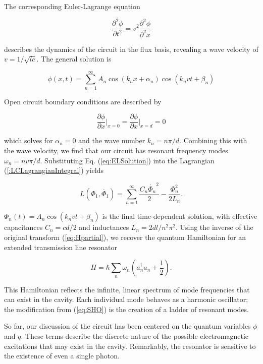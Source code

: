 \documentclass[11 pt, oneside]{book} %
\begin{document}
The corresponding Euler-Lagrange equation

\begin{equation}
\frac{\partial^2\phi}{\partial t^2}=v^2\frac{\partial^2\phi}{\partial^2 x}
\end{equation}

describes the dynamics of the circuit in the flux basis, revealing a wave velocity of $v=1/\sqrt{lc}$. The general solution is

\begin{equation}\label{eq:ELSolution}
\phi(x,t)=\sum_{n=1}^\infty A_n\cos(k_nx+\alpha_n)\cos(k_nvt+\beta_n)
\end{equation}

Open circuit boundary conditions are described by 

\begin{equation}
\frac{\partial\phi}{\partial x}\bigg|_{x=0}=\frac{\partial\phi}{\partial x}\bigg|_{x=d}=0
\end{equation}

which solves for $\alpha_n=0$ and the wave number $k_n=n\pi/d$. Combining this with the wave velocity, we find that our circuit has resonant frequency modes $\omega_n=nv\pi/d$. Substituting Eq. (\ref{eq:ELSolution}) into the Lagrangian (\ref{:LCLagrangianIntegral})  yields 

\begin{equation}
L(\Phi_1, \dot{\Phi_1})=\sum_{n=1}^\infty\frac{C_n\dot{\Phi_n}^2}{2}-\frac{\Phi_n^2}{2L_n}.
\end{equation}

$\Phi_n(t)=A_n\cos(k_nvt+\beta_n)$ is the final time-dependent solution, with effective capacitances $C_n=cd/2$ and inductances $L_n=2dl/n^2\pi^2$. Using the inverse of the original transform (\ref{eq:Hpartial}), we recover the quantum Hamiltonian for an extended transmission line resonator 

\begin{equation}
H=\hbar\sum_n \omega_n (a^\dag_n a_n + \frac{1}{2}).
\end{equation}

This Hamiltonian reflects the infinite, linear spectrum of mode frequencies that can exist in the cavity. Each individual mode behaves as a harmonic oscillator; the modification from (\ref{eq:SHO}) is the creation of a ladder of resonant modes.

 So far, our discussion of the circuit has been centered on the quantum variables $\phi$ and $q$. These terms describe the discrete nature of the possible electromagnetic excitations that may exist in the cavity. Remarkably, the resonator is sensitive to the existence of even a single photon. 
\end{document}
